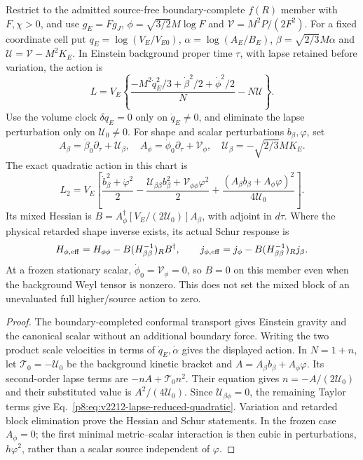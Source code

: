 \documentclass[12pt,a4paper]{article}
\begin{document}
\begin{theorem}
\label{p8:thm:v2212-constrained-shape-hessian}
Restrict to the admitted source-free boundary-complete $f(R)$ member with
$F,\chi>0$, and use
$g_E=Fg_J$, $\phi=\sqrt{3/2}M\log F$ and
$\mathcal V=M^2P/(2F^2)$. For a fixed coordinate cell put
$q_E=\log(V_E/V_{E0})$, $\alpha=\log(A_E/B_E)$,
$\beta=\sqrt{2/3}M\alpha$ and
$\mathcal U=\mathcal V-M^2K_E$. In Einstein background proper time
$\tau$, with lapse retained before variation, the action is
\[
 L=V_E\left\{
 \frac{-M^2\dot q_E^2/3+\dot\beta^2/2+\dot\phi^2/2}{N}
 -N\mathcal U\right\}.
\]
Use the volume clock $\delta q_E=0$ only on $\dot q_E\ne0$, and eliminate
the lapse perturbation only on $\mathcal U_0\ne0$. For shape and scalar
perturbations $b_\beta,\varphi$, set
\[
 A_\beta=\dot\beta_0\partial_\tau+\mathcal U_\beta,
 \quad A_\phi=\dot\phi_0\partial_\tau+\mathcal V_\phi,
 \quad\mathcal U_\beta=-\sqrt{2/3}M K_E.
\]
The exact quadratic action in this chart is
\begin{equation}
\label{p8:eq:v2212-lapse-reduced-quadratic}
 \boxed{L_2=V_E\left[
 \frac{\dot b_\beta^2+\dot\varphi^2}{2}
 -\frac{\mathcal U_{\beta\beta}b_\beta^2+
             \mathcal V_{\phi\phi}\varphi^2}{2}
 +\frac{(A_\beta b_\beta+A_\phi\varphi)^2}{4\mathcal U_0}
 \right].}
\end{equation}
Its mixed Hessian is
$B=A_\phi^\dagger[V_E/(2\mathcal U_0)]A_\beta$, with adjoint in
$d\tau$. Where the physical retarded shape inverse exists, its actual
Schur response is
\[
 H_{\phi,\rm eff}=H_{\phi\phi}
       -B(H_{\beta\beta}^{-1})_R B^\dagger,
 \qquad j_{\phi,\rm eff}=j_\phi-B(H_{\beta\beta}^{-1})_Rj_\beta.
\]
At a frozen stationary scalar, $\dot\phi_0=\mathcal V_\phi=0$, so
$B=0$ on this member even when the background Weyl tensor is nonzero.
This does not set the mixed block of an unevaluated full higher/source
action to zero.
\end{theorem}
\begin{proof}
The boundary-completed conformal transport gives Einstein gravity and
the canonical scalar without an additional boundary force. Writing the
two product scale velocities in terms of $\dot q_E,\dot\alpha$ gives
the displayed action. In $N=1+n$, let
$\mathcal T_0=-\mathcal U_0$ be the background kinetic bracket and
$A=A_\beta b_\beta+A_\phi\varphi$. Its second-order lapse terms are
$-nA+\mathcal T_0n^2$. Their equation gives
$n=-A/(2\mathcal U_0)$ and their substituted value is
$A^2/(4\mathcal U_0)$. Since
$\mathcal U_{\beta\phi}=0$, the remaining Taylor terms give
Eq.~\eqref{p8:eq:v2212-lapse-reduced-quadratic}. Variation and retarded
block elimination prove the Hessian and Schur statements. In the frozen
case $A_\phi=0$; the first minimal metric--scalar interaction is then
cubic in perturbations, $h\varphi^2$, rather than a scalar source
independent of $\varphi$.
\end{proof}
\end{document}
